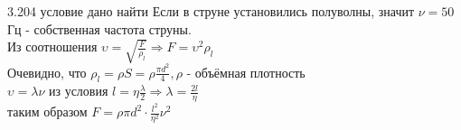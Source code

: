 \testCom
{%
	3.204
}
{%
	условие
}
{%
	дано
}
{%
	найти
}
{%
	Если в струне установились полуволны, значит $\nu = 50$Гц - собственная частота струны.\\
	Из соотношения $\upsilon = \sqrt{\frac{F}{\rho_l}} \Rightarrow F = \upsilon^2 \rho_l$\\
	Очевидно, что $\rho_l = \rho S = \rho \frac{\pi d^2}{4}, \rho$ - объёмная плотность\\
	$\upsilon = \lambda \nu$ из условия $l = \eta \frac{\lambda}{2} \Rightarrow \lambda = \frac{2 l}{\eta}$\\
	таким образом $F = \rho \pi d^2 \cdot \frac{l^2}{\eta^2} \nu^2$\\
}

